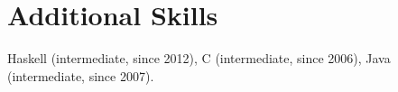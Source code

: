 \documentclass[11pt]{article}
\begin{document}
\section*{Additional Skills}
Haskell (intermediate, since 2012), C (intermediate, since 2006), Java (intermediate, since 2007). 
%



\end{document}
